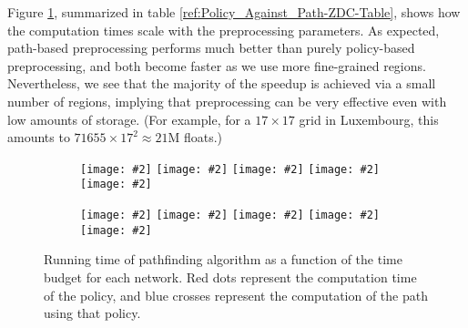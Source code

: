 \documentclass[oribibl]{llncs}
\newcommand{\includepdfplot}[2][]{\begingroup\texttt{[image: \#2]}\endgroup}
\begin{document}
			Figure \ref{ref:Policy_Against_Path-ZDC},
			summarized in table \ref{ref:Policy_Against_Path-ZDC-Table},
			shows how the computation times scale with the preprocessing parameters.
			As expected, path-based preprocessing performs much better than purely policy-based preprocessing,
			and both become faster as we use more fine-grained regions.
			Nevertheless, we see that the majority of the speedup is achieved via a small number of regions,
			implying that preprocessing can be very effective even with low amounts of storage.
			(For example, for a $17\times 17$ grid in Luxembourg, this amounts to
			$71655 \times 17^2 \approx 21\mathrm{M}$ floats.)
			\begin{figure}[H]
				\centering
				\begin{subfigure}[t]{0.512\textwidth}
					\centering
					\includepdfplot[width=\textwidth]{Preprocessing-ZDC-SF-NoSource-0-Log.pdf}
					\includepdfplot[width=\textwidth]{Preprocessing-ZDC-SF-NoSource-100-Log.pdf}
					\includepdfplot[width=\textwidth]{Preprocessing-ZDC-SF-NoSource-676-Log.pdf}
					\includepdfplot[width=\textwidth]{Preprocessing-ZDC-SF-WithSource-100-Log.pdf}
					\includepdfplot[width=\textwidth]{Preprocessing-ZDC-SF-WithSource-676-Log.pdf}
				\end{subfigure}
				\begin{subfigure}[t]{0.478\textwidth}
					\centering
					\includepdfplot[width=\textwidth]{Preprocessing-ZDC-Luxembourg-NoSource-0-Log.pdf}
					\includepdfplot[width=\textwidth]{Preprocessing-ZDC-Luxembourg-NoSource-289-Log.pdf}
					\includepdfplot[width=\textwidth]{Preprocessing-ZDC-Luxembourg-NoSource-1156-Log.pdf}
					\includepdfplot[width=\textwidth]{Preprocessing-ZDC-Luxembourg-WithSource-289-Log.pdf}
					\includepdfplot[width=\textwidth]{Preprocessing-ZDC-Luxembourg-WithSource-1156-Log.pdf}
				\end{subfigure}
				\caption
				{
					Running time of pathfinding algorithm as a function of the time budget for each
					network. Red dots represent the computation time of the policy,
					and blue crosses represent the computation of the path using that policy.
				}
				\label{ref:Policy_Against_Path-ZDC}
			\end{figure}
\end{document}
